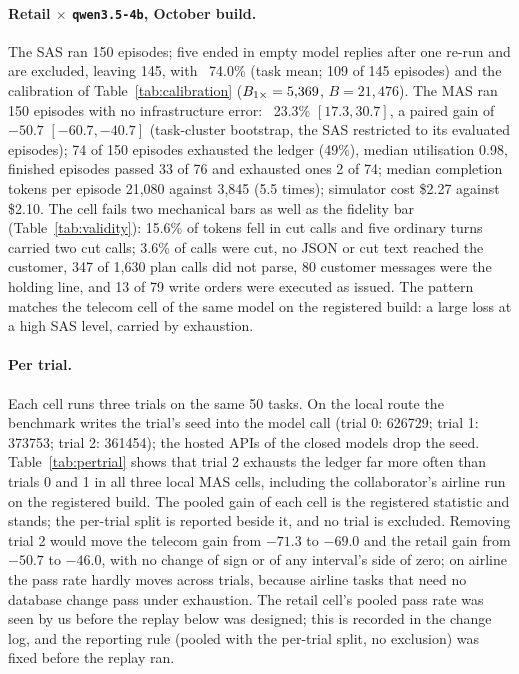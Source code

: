 \paragraph{Retail $\times$ \texttt{qwen3.5-4b}, October build.} The SAS ran 150 episodes; five ended in empty model replies after one re-run and are excluded, leaving 145, with \passone\ 74.0\% (task mean; 109 of 145 episodes) and the calibration of Table~\ref{tab:calibration} ($B_{1\times} = 5{,}369$, $B = 21{,}476$). The MAS ran 150 episodes with no infrastructure error: \passone\ 23.3\% $[17.3, 30.7]$, a paired gain of $-50.7$ $[-60.7, -40.7]$ (task-cluster bootstrap, the SAS restricted to its evaluated episodes); 74 of 150 episodes exhausted the ledger (49\%), median utilisation 0.98, finished episodes passed 33 of 76 and exhausted ones 2 of 74; median completion tokens per episode 21,080 against 3,845 (5.5 times); simulator cost \$2.27 against \$2.10. The cell fails two mechanical bars as well as the fidelity bar (Table~\ref{tab:validity}): 15.6\% of tokens fell in cut calls and five ordinary turns carried two cut calls; 3.6\% of calls were cut, no JSON or cut text reached the customer, 347 of 1,630 plan calls did not parse, 80 customer messages were the holding line, and 13 of 79 write orders were executed as issued. The pattern matches the telecom cell of the same model on the registered build: a large loss at a high SAS level, carried by exhaustion.

\paragraph{Per trial.} Each cell runs three trials on the same 50 tasks. On the local route the benchmark writes the trial's seed into the model call (trial 0: 626729; trial 1: 373753; trial 2: 361454); the hosted APIs of the closed models drop the seed. Table~\ref{tab:pertrial} shows that trial 2 exhausts the ledger far more often than trials 0 and 1 in all three local MAS cells, including the collaborator's airline run on the registered build. The pooled gain of each cell is the registered statistic and stands; the per-trial split is reported beside it, and no trial is excluded. Removing trial 2 would move the telecom gain from $-71.3$ to $-69.0$ and the retail gain from $-50.7$ to $-46.0$, with no change of sign or of any interval's side of zero; on airline the pass rate hardly moves across trials, because airline tasks that need no database change pass under exhaustion. The retail cell's pooled pass rate was seen by us before the replay below was designed; this is recorded in the change log, and the reporting rule (pooled with the per-trial split, no exclusion) was fixed before the replay ran.

